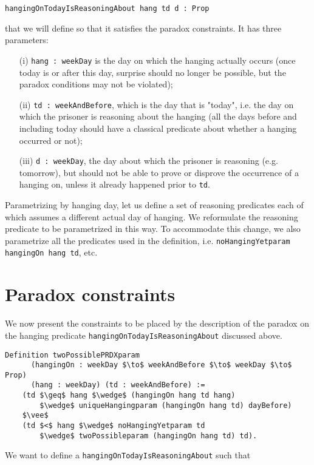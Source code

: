 \documentclass[runningheads]{llncs}
\begin{document}
{\tt hangingOnTodayIsReasoningAbout hang td d : Prop}

that we will define so that it satisfies the paradox constraints. It has three parameters:

\begin{itemize}
  \item[(i)] {\tt hang : weekDay} is the day on which the hanging actually occurs
  (once today is or after this day, surprise should no longer be possible, but the paradox
  conditions may not be violated);
  \item[(ii)] {\tt td : weekAndBefore}, which is the day that is "today", i.e. the day
  on which the prisoner is reasoning about the hanging (all the days before and including today
  should have a classical predicate about whether a hanging occurred or not);
  \item[(iii)] {\tt d : weekDay}, the day about which the prisoner is reasoning (e.g.
  tomorrow), but should not be able to prove or disprove the occurrence of a hanging on,
  unless it already happened prior to {\tt td}.
\end{itemize}

Parametrizing by hanging day, let us define a set of reasoning predicates
each of which assumes a different actual day of hanging.
We reformulate the reasoning predicate to be parametrized in this way.
To accommodate this change, we also parametrize all
the predicates used in the definition, i.e. {\tt noHangingYetparam hangingOn hang td}, etc.

\section{Paradox constraints}
\label{sec:constraints}

We now present the constraints to be placed by the description of the paradox on the
hanging predicate {\tt hangingOnTodayIsReasoningAbout} discussed above.

\begin{lstlisting}[mathescape=true]
  Definition twoPossiblePRDXparam
      (hangingOn : weekDay $\to$ weekAndBefore $\to$ weekDay $\to$ Prop)
      (hang : weekDay) (td : weekAndBefore) :=
    (td $\geq$ hang $\wedge$ (hangingOn hang td hang)
        $\wedge$ uniqueHangingparam (hangingOn hang td) dayBefore)
    $\vee$
    (td $<$ hang $\wedge$ noHangingYetparam td
        $\wedge$ twoPossibleparam (hangingOn hang td) td).
\end{lstlisting}

We want to define a {\tt hangingOnTodayIsReasoningAbout} such that
\end{document}
